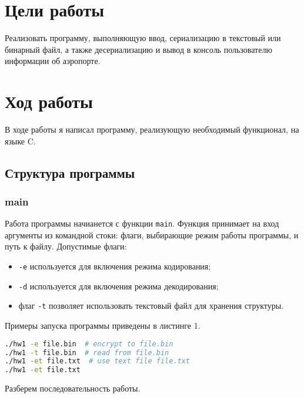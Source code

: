 \section{Цели работы}
Реализовать программу, выполняющую ввод, сериализацию в текстовый или бинарный файл, а также десериализацию и вывод в консоль пользователю информации об аэропорте.



\section{Ход работы}
В ходе работы я написал программу, реализующую необходимый функционал, на языке C.
\subsection{Структура программы}
\subsubsection{main}
Работа программы начианется с функции \texttt{main}. Функция принимает на вход аргументы из командной стоки: флаги, выбирающие режим работы программы, и путь к файлу. Допустимые флаги:


\begin{itemize}
    \item \verb|-e| используется для включения режима кодирования;
    \item \verb|-d| используется для включения режима декодирования;
    \item флаг \verb|-t| позволяет использовать текстовый файл для хранения структуры.
\end{itemize}

Примеры запуска программы приведены в листинге 1.

\begin{lstlisting}[language=bash, numbers=none, caption={Примеры запуска программы}]
./hw1 -e file.bin  # encrypt to file.bin
./hw1 -t file.bin  # read from file.bin
./hw1 -et file.txt  # use text file file.txt
./hw1 -et file.txt
\end{lstlisting}

Разберем последовательность работы.

